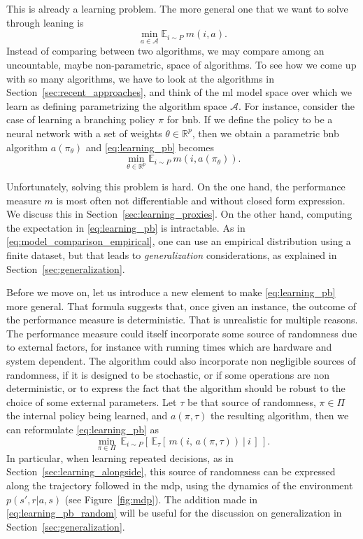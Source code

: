 \documentclass[11pt]{article}
\begin{document}
		This is already a learning problem.
		The more general one that we want to solve through leaning is
		\begin{equation}
			\label{eq:learning_pb}
			\min_{a \in \mathcal{A}} \mathbb{E}_{i \sim P}\ m(i, a).
		\end{equation}
		Instead of comparing between two algorithms, we may compare among an uncountable, maybe
		non-parametric, space of algorithms.
		To see how we come up with so many algorithms, we have to look at the algorithms in
		Section~\ref{sec:recent_approaches}, and think of the \gls{ml} model space over which we learn as
		defining parametrizing the algorithm space $\mathcal{A}$.
		For instance, consider the case of learning a branching policy $\pi$ for \gls{bnb}.
		If we define the policy to be a neural network with a set of weights $\theta \in \mathbb{R}^p$,
		then we obtain a parametric \gls{bnb} algorithm $a(\pi_\theta)$ and \eqref{eq:learning_pb} becomes
		\begin{equation}
			\min_{\theta \in \mathbb{R}^p} \mathbb{E}_{i \sim P}\ m(i, a(\pi_\theta)).
		\end{equation}

		Unfortunately, solving this problem is hard.
		On the one hand, the performance measure $m$ is most often not differentiable and without
		closed form expression.
		We discuss this in Section~\ref{sec:learning_proxies}.
		On the other hand, computing the expectation in \eqref{eq:learning_pb} is intractable.
		As in \eqref{eq:model_comparison_empirical}, one can use an empirical distribution using a
		finite dataset, but that leads to \emph{generalization} considerations, as explained in
		Section~\ref{sec:generalization}.

		Before we move on, let us introduce a new element to make \eqref{eq:learning_pb} more
		general.
		That formula suggests that, once given an instance, the outcome of the performance measure is
		deterministic.
		That is unrealistic for multiple reasons.
		The performance measure could itself incorporate some source of randomness due to external
		factors, for instance with running times which are hardware and system dependent.
		The algorithm could also incorporate non negligible sources of randomness, if it is designed
		to be stochastic, or if some operations are non deterministic, or to express the fact that the
		algorithm should be robust to the choice of some external parameters.
		Let $\tau$ be that source of randomness, $\pi \in \Pi$ the internal policy being learned, and
		$a(\pi, \tau)$ the resulting algorithm, then we can reformulate \eqref{eq:learning_pb} as
		\begin{equation}
			\label{eq:learning_pb_random}
			\min_{\pi \in \Pi}\
			\mathbb{E}_{i \sim P}
			\left [ \,
			    \mathbb{E}_\tau [\, m(i,\, a(\pi, \tau))\ |\ i \,]
			\, \right ].
		\end{equation}
		In particular, when learning repeated decisions, as in
		Section~\ref{sec:learning_alongside}, this source of randomness can be expressed along the
		trajectory followed in the \gls{mdp}, using the dynamics of the environment $p(s',r|a,s)$ (see
		Figure~\ref{fig:mdp}).
		The addition made in \eqref{eq:learning_pb_random} will be useful for the discussion on
		generalization in Section~\ref{sec:generalization}.
\end{document}
